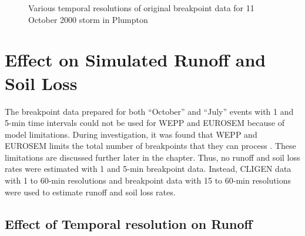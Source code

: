 \begin{figure}[htbp]
    \qquad
  \caption{Various temporal resolutions of original breakpoint data for 11
October
2000 storm in Plumpton}
  \label{fig:pl_storm}
\end{figure}

\section{Effect on Simulated Runoff and Soil Loss}
\label{sec:TemporalScalesSimulatedRunoffAndSoilLoss}

The breakpoint data prepared for both ``October'' and ``July'' events with 1 and
5-min time intervals could not be used for WEPP and EUROSEM because of model
limitations. During investigation, it was found that WEPP and EUROSEM limits the
total number of breakpoints that they can process
\citep{flanagan1995-weppusersummary, morgan1998-europeansoilerosion}. These
limitations are discussed further later in the chapter. Thus, no runoff and soil
loss rates were estimated with 1 and 5-min breakpoint data. Instead, CLIGEN data
with 1 to 60-min resolutions and breakpoint data with 15 to 60-min resolutions
were used
to estimate runoff and soil loss rates.

\subsection{Effect of Temporal resolution on Runoff}
\label{sec:TemporalScalesSimulatedRunoff}

